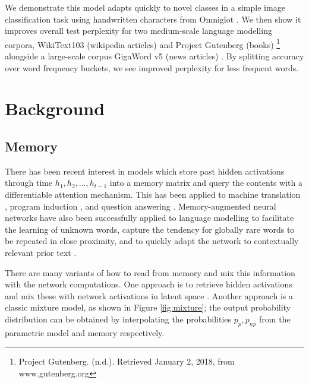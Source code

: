 \documentclass{article} \usepackage{hyperref}
\begin{document}
We demonstrate this model adapts quickly to novel classes in a simple image classification task using handwritten characters from Omniglot \cite{lake2015human}. We then show it improves overall test perplexity for two medium-scale language modelling corpora, WikiText103 (wikipedia articles) \citep{merity2016pointer} and Project Gutenberg  (books) \footnote{Project Gutenberg. (n.d.). Retrieved January 2, 2018, from www.gutenberg.org} alongside a large-scale corpus GigaWord v5 (news articles) \citep{parker2011english}. By splitting accuracy over word frequency buckets, we see improved perplexity for less frequent words. 


\section{Background}




\subsection{Memory}


There has been recent interest in models which store past hidden activations through time $h_1, h_2, \ldots, h_{t-1}$ into a memory matrix and query the contents with a differentiable attention mechanism. This has been applied to  machine translation \citep{bahdanau2014neural}, program induction \citep{graves2014neural, graves2016hybrid}, and question answering \citep{sukhbaatar2015end}. Memory-augmented neural networks have also been successfully applied to language modelling \citep{vinyals2015pointer, kawakami2017learning, merity2016pointer, grave2016improving, grave2017unbounded} to facilitate the learning of unknown words, capture the tendency for globally rare words to be repeated in close proximity, and to quickly adapt the network to contextually relevant prior text \citep{sprechmann2018memorybased}.

There are many variants of how to read from memory and mix this information with the network computations. One approach is to retrieve hidden activations and mix these with network activations in latent space \citep{gulcehre2016pointing}. Another approach is a classic mixture model, as shown in Figure \ref{fig:mixture}; the output probability distribution can be obtained by interpolating the probabilities $p_p, p_{np}$ from the parametric model and memory respectively.
\end{document}
